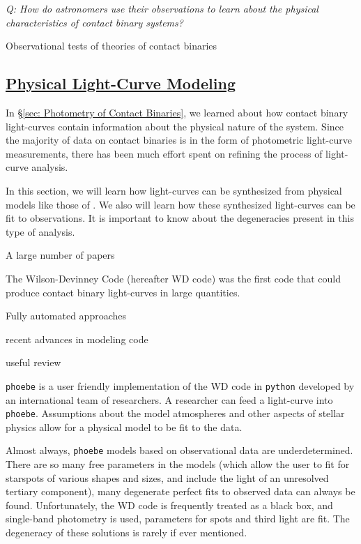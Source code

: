 \documentclass[12pt]{article} %
\numberwithin{equation}{section} %
\begin{document}
\emph{Q: How do astronomers use their observations to learn about the physical characteristics of contact binary systems?}

Observational tests of theories of contact binaries \citet{lucy1979observational}

\subsection[Physical Light-Curve Modeling]{\hyperlink{toc}{Physical Light-Curve Modeling}} \label{sec: Physical Light-Curve Modeling}

In \S\ref{sec: Photometry of Contact Binaries}, we learned about how contact binary light-curves contain information about the physical nature of the system. Since the majority of data on contact binaries is in the form of photometric light-curve measurements, there has been much effort spent on refining the process of light-curve analysis.

In this section, we will learn how light-curves can be synthesized from physical models like those of \citet{lucy1968contact}. We also will learn how these synthesized light-curves can be fit to observations. It is important to know about the degeneracies present in this type of analysis. 

A large number of papers 

The Wilson-Devinney Code (hereafter WD code)  was the first code that could produce contact binary light-curves in large quantities. 

Fully automated approaches \citep{prsa2009fully} \citep{prsa2008artificial}

recent advances in modeling code \citep{prvsa2013physics}

useful review \citep{gimenez2006close}

\texttt{phoebe} is a user friendly implementation of the WD code in \texttt{python} developed by an international team of researchers. A researcher can feed a light-curve into \texttt{phoebe}. Assumptions about the model atmospheres and other aspects of stellar physics allow for a physical model to be fit to the data.

Almost always, \texttt{phoebe} models based on observational data are underdetermined. There are so many free parameters in the models (which allow the user to fit for starspots of various shapes and sizes, and include the light of an unresolved tertiary component), many degenerate perfect fits to observed data can always be found. Unfortunately, the WD code is frequently treated as a black box, and single-band photometry is used, parameters for spots and third light are fit. The degeneracy of these solutions is rarely if ever mentioned. 
\end{document}
